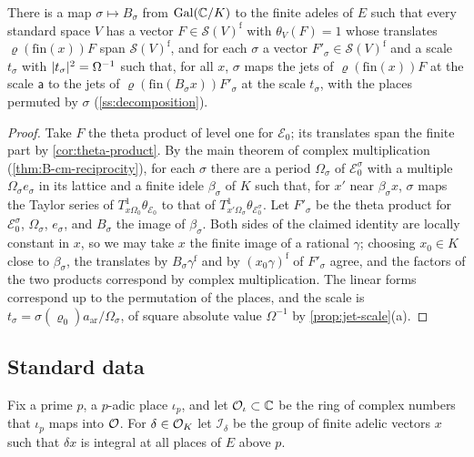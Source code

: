 \begin{proposition}\label{prop:jet-conjugates}
There is a map $\sigma\mapsto B_\sigma$ from $\operatorname{Gal}(\mathbb{C}/K)$ to the finite adeles of $E$ such that every
standard space $V$ has a vector $F\in\mathcal S(V)^{\mathrm f}$ with $\theta_V(F)=1$ whose translates
$\varrho(\mathrm{fin}(x))F$ span $\mathcal S(V)^{\mathrm f}$, and for each $\sigma$ a vector
$F'_\sigma\in\mathcal S(V)^{\mathrm f}$ and a scale $t_\sigma$ with $\lvert t_\sigma\rvert^2=\Omega^{-1}$ such that,
for all $x$, $\sigma$ maps the jets of $\varrho(\mathrm{fin}(x))F$ at the scale $\mathsf a$ to the jets of
$\varrho(\mathrm{fin}(B_\sigma x))F'_\sigma$ at the scale $t_\sigma$, with the places permuted by $\sigma$
(\cref{ss:decomposition}).
\end{proposition}

\begin{proof}
Take $F$ the theta product of level one for $\mathcal E_0$; its translates span the finite part by
\cref{cor:theta-product}. By the main theorem of complex multiplication
(\cref{thm:B-cm-reciprocity}), for each $\sigma$ there are a period $\Omega_\sigma$ of $\mathcal E_0^\sigma$
with a multiple $\Omega_\sigma e_\sigma$ in its lattice and a finite idele $\beta_\sigma$ of $K$ such that,
for $x'$ near $\beta_\sigma x$, $\sigma$ maps the Taylor series of $T^1_{x\Omega_0}\theta_{\mathcal E_0}$
to that of $T^1_{x'\Omega_\sigma}\theta_{\mathcal E_0^\sigma}$. Let $F'_\sigma$ be the theta product for
$\mathcal E_0^\sigma$, $\Omega_\sigma$, $e_\sigma$, and $B_\sigma$ the image of $\beta_\sigma$. Both sides of
the claimed identity are locally constant in $x$, so we may take $x$ the finite image of a rational
$\gamma$; choosing $x_0\in K$ close to $\beta_\sigma$, the translates by $B_\sigma\gamma^{\mathrm f}$ and by
$(x_0\gamma)^{\mathrm f}$ of $F'_\sigma$ agree, and the factors of the two products correspond by complex
multiplication. The linear forms correspond up to the permutation of the places, and the scale is
$t_\sigma=\sigma(\varrho_0)a_{\mathrm{ar}}/\Omega_\sigma$, of square absolute value $\Omega^{-1}$ by
\cref{prop:jet-scale}(a).
\end{proof}

\subsection{Standard data}\label{ss:standard-data}
Fix a prime $p$, a $p$-adic place $\iota_p$, and let $\mathcal{O}_{\iota}\subset\mathbb{C}$ be the ring of complex numbers
that $\iota_p$ maps into $\mathcal{O}$. For $\delta\in\mathcal{O}_K$ let $\mathcal I_\delta$ be the group of finite adelic
vectors $x$ such that $\delta x$ is integral at all places of $E$ above $p$.

